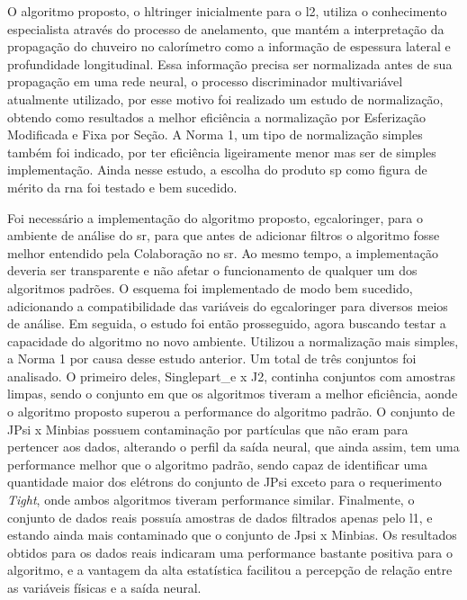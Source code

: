 O algoritmo proposto, o \gls{hltringer} inicialmente para o \gls{l2}, utiliza o
conhecimento especialista através do processo de anelamento, que mantém a interpretação da propagação do
chuveiro no calorímetro como a informação de espessura lateral e profundidade
longitudinal. Essa informação precisa ser normalizada antes de sua propagação em
uma rede neural, o processo discriminador multivariável atualmente utilizado,
por esse motivo foi realizado um estudo de normalização, obtendo como resultados
a melhor eficiência a normalização por Esferização Modificada e Fixa por Seção.
A Norma 1, um tipo de normalização simples também foi indicado, por ter
eficiência ligeiramente menor mas ser de simples implementação. Ainda nesse
estudo, a escolha do produto \gls{sp} como figura de mérito da \gls{rna} foi
testado e bem sucedido.

Foi necessário a implementação do algoritmo proposto, \gls{egcaloringer}, para o ambiente de análise
do \gls{sr}, para que antes de adicionar filtros o algoritmo fosse melhor
entendido pela Colaboração no \gls{sr}. Ao mesmo tempo, a implementação deveria ser transparente e não
afetar o funcionamento de qualquer um dos algoritmos padrões. O esquema foi
implementado de modo bem sucedido, adicionando a compatibilidade das variáveis
do \gls{egcaloringer} para diversos meios de análise. Em seguida, o estudo foi então
prosseguido, agora buscando testar a capacidade do algoritmo no novo ambiente.
Utilizou a normalização mais simples, a Norma 1 por causa desse estudo anterior.
Um total de três conjuntos foi analisado. O primeiro deles, Singlepart\_e x J2,
continha conjuntos com amostras limpas, sendo o conjunto em que os algoritmos
tiveram a melhor eficiência, aonde o algoritmo proposto superou a performance do
algoritmo padrão. O conjunto de JPsi x Minbias possuem contaminação por
partículas que não eram para pertencer aos dados, alterando o perfil da saída
neural, que ainda assim, tem uma performance melhor que o algoritmo padrão, sendo
capaz de identificar uma quantidade maior dos elétrons do conjunto de JPsi
exceto para o requerimento \emph{Tight}, onde ambos algoritmos tiveram
performance similar. Finalmente, o conjunto de dados reais possuía amostras de
dados filtrados apenas pelo \gls{l1}, e estando ainda mais contaminado que o
conjunto de Jpsi x Minbias. Os resultados obtidos para os dados reais indicaram
uma performance bastante positiva para o algoritmo, e a vantagem da alta
estatística facilitou a percepção de relação entre as variáveis físicas e a saída
neural.

